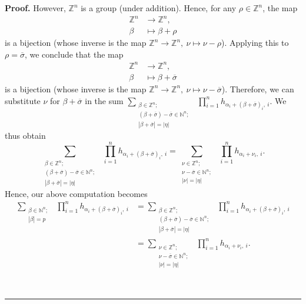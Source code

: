 \documentclass[numbers=enddot,12pt,final,onecolumn,notitlepage,english]{scrartcl}%
\theoremstyle{definition}
\newenvironment{proof}[1][Proof]{\noindent\textbf{#1.} }{\ \rule{0.5em}{0.5em}}
\let\sumnonlimits\sum
\let\prodnonlimits\prod
\renewcommand{\sum}{\sumnonlimits\limits}
\renewcommand{\prod}{\prodnonlimits\limits}
\newenvironment{verlong}{}{}
\begin{document}
\begin{verlong}
\begin{proof}
However, $\mathbb{Z}^{n}$ is a group (under addition). Hence, for any $\rho
\in\mathbb{Z}^{n}$, the map%
\begin{align*}
\mathbb{Z}^{n}  &  \rightarrow\mathbb{Z}^{n},\\
\beta &  \mapsto\beta+\rho
\end{align*}
is a bijection (whose inverse is the map $\mathbb{Z}^{n}\rightarrow
\mathbb{Z}^{n},\ \nu\mapsto\nu-\rho$). Applying this to $\rho=\overline
{\sigma}$, we conclude that the map
\begin{align*}
\mathbb{Z}^{n}  &  \rightarrow\mathbb{Z}^{n},\\
\beta &  \mapsto\beta+\overline{\sigma}%
\end{align*}
is a bijection (whose inverse is the map $\mathbb{Z}^{n}\rightarrow
\mathbb{Z}^{n},\ \nu\mapsto\nu-\overline{\sigma}$). Therefore, we can
substitute $\nu$ for $\beta+\overline{\sigma}$ in the sum $\sum
_{\substack{\beta\in\mathbb{Z}^{n};\\\left(  \beta+\overline{\sigma}\right)
-\overline{\sigma}\in\mathbb{N}^{n};\\\left\vert \beta+\overline{\sigma
}\right\vert =\left\vert \eta\right\vert }}\ \ \prod_{i=1}^{n}h_{\alpha
_{i}+\left(  \beta+\overline{\sigma}\right)  _{i},\ i}$. We thus obtain%
\[
\sum_{\substack{\beta\in\mathbb{Z}^{n};\\\left(  \beta+\overline{\sigma
}\right)  -\overline{\sigma}\in\mathbb{N}^{n};\\\left\vert \beta
+\overline{\sigma}\right\vert =\left\vert \eta\right\vert }}\ \ \prod
_{i=1}^{n}h_{\alpha_{i}+\left(  \beta+\overline{\sigma}\right)  _{i},\ i}%
=\sum_{\substack{\nu\in\mathbb{Z}^{n};\\\nu-\overline{\sigma}\in\mathbb{N}%
^{n};\\\left\vert \nu\right\vert =\left\vert \eta\right\vert }}\ \ \prod
_{i=1}^{n}h_{\alpha_{i}+\nu_{i},\ i}.
\]
Hence, our above computation becomes%
\begin{align}
\sum_{\substack{\beta\in\mathbb{N}^{n};\\\left\vert \beta\right\vert
=p}}\ \ \prod_{i=1}^{n}h_{\alpha_{i}+\left(  \beta+\overline{\sigma}\right)
_{i},\ i}  &  =\sum_{\substack{\beta\in\mathbb{Z}^{n};\\\left(  \beta
+\overline{\sigma}\right)  -\overline{\sigma}\in\mathbb{N}^{n};\\\left\vert
\beta+\overline{\sigma}\right\vert =\left\vert \eta\right\vert }%
}\ \ \prod_{i=1}^{n}h_{\alpha_{i}+\left(  \beta+\overline{\sigma}\right)
_{i},\ i}\nonumber\\
&  =\sum_{\substack{\nu\in\mathbb{Z}^{n};\\\nu-\overline{\sigma}\in
\mathbb{N}^{n};\\\left\vert \nu\right\vert =\left\vert \eta\right\vert
}}\ \ \prod_{i=1}^{n}h_{\alpha_{i}+\nu_{i},\ i}.
\label{pf.thm.pre-pieri.innersum}%
\end{align}



\end{proof}
\end{verlong}
\end{document}
